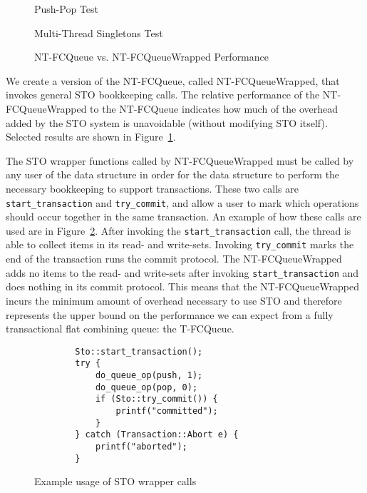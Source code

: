 \begin{figure}[H]
    \centering
	\begin{minipage}{0.75\textwidth}
        \caption*{Push-Pop Test}
        \vspace{12pt}
	\end{minipage}
   	\begin{minipage}{0.75\textwidth}
        \caption*{Multi-Thread Singletons Test}
	\end{minipage}
        \caption{NT-FCQueue vs. NT-FCQueueWrapped Performance}
    \label{fig:wrappedqs}
\end{figure}

We create a version of the NT-FCQueue, called NT-FCQueueWrapped, that invokes general STO bookkeeping calls. The relative performance of the NT-FCQueueWrapped to the NT-FCQueue indicates how much of the overhead added by the STO system is unavoidable (without modifying STO itself). 
Selected results are shown in Figure~\ref{fig:wrappedqs}.

The STO wrapper functions called by NT-FCQueueWrapped must be called by any user of the data structure in order for the data structure to perform the necessary bookkeeping to support transactions.
These two calls are \texttt{start\_transaction} and \texttt{try\_commit}, and allow a user to mark which operations should occur together in the same transaction. An example of how these calls are used are in Figure~\ref{fig:wrappers}. After invoking the \texttt{start\_transaction} call, the thread is able to collect items in its read- and write-sets. Invoking \texttt{try\_commit} marks the end of the transaction runs the commit protocol. The NT-FCQueueWrapped adds no items to the read- and write-sets after invoking \texttt{start\_transaction} and does nothing in its commit protocol. This means that the NT-FCQueueWrapped incurs the minimum amount of overhead necessary to use STO and therefore represents the upper bound on the performance we can expect from a fully transactional flat combining queue: the T-FCQueue. 

\begin{figure}[H]
\centering
\singlespace
{}
	\begin{lstlisting}
		Sto::start_transaction();
		try {
			do_queue_op(push, 1);
			do_queue_op(pop, 0);
			if (Sto::try_commit()) {
				printf("committed");
			}
		} catch (Transaction::Abort e) {
			printf("aborted");
		}
	\end{lstlisting}
\caption{Example usage of STO wrapper calls}
\label{fig:wrappers}
\end{figure}

